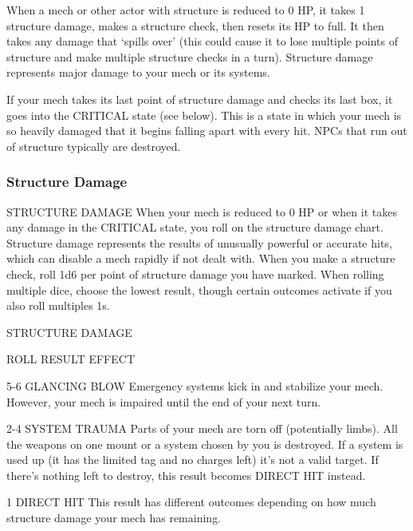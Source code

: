 When a mech or other actor with structure is reduced to 0 HP, it takes 1 structure damage,
makes a structure check, then resets its HP to full. It then takes any damage that ‘spills
over’ (this could cause it to lose multiple points of structure and make multiple structure checks
in a turn). Structure damage represents major damage to your mech or its systems.


If your mech takes its last point of structure damage and checks its last box, it goes into the
CRITICAL state (see below). This is a state in which your mech is so heavily damaged that it
begins falling apart with every hit. NPCs that run out of structure typically are destroyed.

\subsubsection{Structure Damage}
                                        STRUCTURE DAMAGE
When your mech is reduced to 0 HP or when it takes any damage in the CRITICAL state, you roll
on the structure damage chart. Structure damage represents the results of unusually powerful or
accurate hits, which can disable a mech rapidly if not dealt with. When you make a structure
check, roll 1d6 per point of structure damage you have marked. When rolling multiple dice,
choose the lowest result, though certain outcomes activate if you also roll multiples 1s.


                                            STRUCTURE DAMAGE

 ROLL            RESULT                   EFFECT

 5-6             GLANCING BLOW            Emergency systems kick in and stabilize your mech. However, your
                                          mech is impaired until the end of your next turn.

 2-4             SYSTEM TRAUMA            Parts of your mech are torn off (potentially limbs). All the weapons
                                          on one mount or a system chosen by you is destroyed. If a system
                                          is used up (it has the limited tag and no charges left) it’s not a valid
                                          target. If there’s nothing left to destroy, this result becomes DIRECT
                                          HIT instead.

 1               DIRECT HIT               This result has different outcomes depending on how much
                                          structure damage your mech has remaining.

